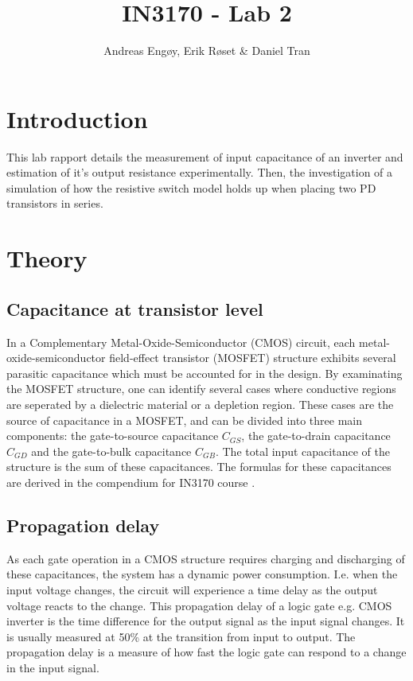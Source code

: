 \documentclass[onecolumn]{article}
\title{IN3170 - Lab 2}
\author{Andreas Engøy, Erik Røset \& Daniel Tran}
\date{\monthname[\the\month] \the\year}
\begin{document}
\maketitle
\tableofcontents

\section{Introduction}
This lab rapport details the measurement of input capacitance of an inverter and
estimation of it's output resistance experimentally. Then, the investigation of a simulation of how the resistive switch model holds up when placing two
PD transistors in series.

\section{Theory}

\subsection{Capacitance at transistor level}
In a Complementary Metal-Oxide-Semiconductor (CMOS) circuit, each metal-oxide-semiconductor field-effect transistor (MOSFET) structure exhibits several parasitic capacitance which must be accounted for in the design. By examinating the MOSFET structure, one can identify several cases where conductive regions are seperated by a dielectric material or a depletion region. These cases are the source of capacitance in a MOSFET, and can be divided into three main components: the gate-to-source capacitance $C_{GS}$, the gate-to-drain capacitance $C_{GD}$ and the gate-to-bulk capacitance $C_{GB}$. The total input capacitance of the structure is the sum of these capacitances. The formulas for these capacitances are derived in the compendium for IN3170 course \cite{Kompendium}.


\subsection{Propagation delay}
As each gate operation in a CMOS structure requires charging and discharging of these capacitances, the system has a dynamic power consumption. I.e. when the input voltage changes, the circuit will experience a time delay as the output voltage reacts to the change. This propagation delay of a logic gate e.g. CMOS inverter is the time difference for the output signal as the input signal changes. It is usually measured at 50\% at the transition from input to output. The propagation delay is a measure of how fast the logic gate can respond to a change in the input signal.
\end{document}
